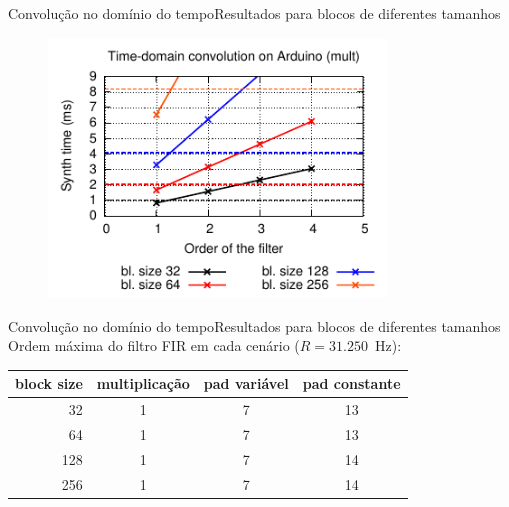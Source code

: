 \begin{frame}{Convolução no domínio do tempo}{Resultados para blocos de diferentes tamanhos}
\begin{figure}
\includegraphics[width=0.8\textwidth]{./img/convolution-comparison-mult.pdf}
\end{figure}
\end{frame}

\begin{frame}{Convolução no domínio do tempo}{Resultados para blocos de diferentes tamanhos}
Ordem máxima do filtro FIR em cada cenário ($R=31.250$~Hz):
\begin{center}
\begin{tabular}{rccc}
\toprule
\toprule
\footnotesize{block size}  & \footnotesize{multiplicação} & \footnotesize{pad variável} & \footnotesize{pad constante} \\
\midrule
32  & 1 & 7 & 13 \\
64  & 1 & 7 & 13 \\
128 & 1 & 7 & 14 \\
256 & 1 & 7 & 14 \\
\bottomrule
\end{tabular}
\end{center}
\end{frame}

